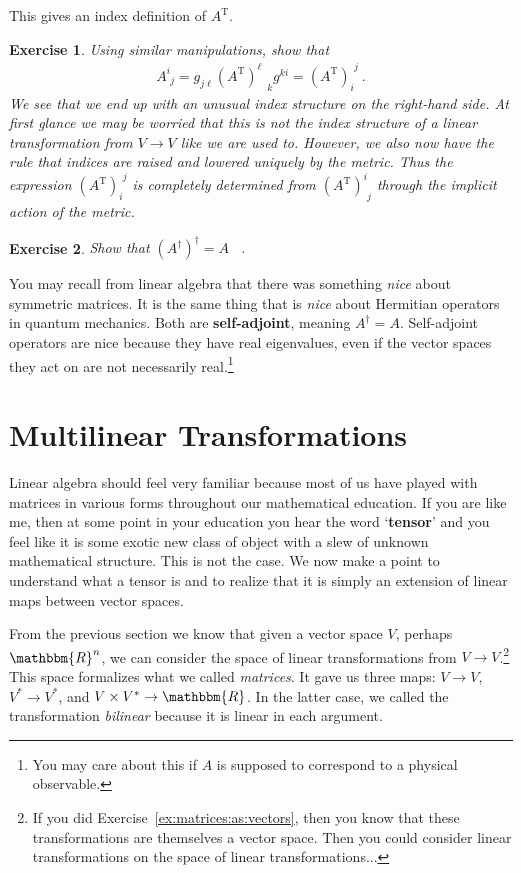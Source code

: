 \documentclass[
  11pt,
	colorful,
	raggedright,
]{tufte-style-thesis-flip}
\newtheorem{exercise}{Exercise}[section]
\newcommand{\aij}[2]{^{#1}_{\phantom{#1}#2}}
\begin{document}
This gives an index definition of $A^\text{T}$. 
\begin{exercise}
Using similar manipulations, show that
\begin{align}
  A\aij{
  i}{j} = g_{j\ell} \left(A^\text{T}\right)\aij{\ell}{k} g^{ki} 
  = \left(A^\text{T}\right)_i^{\phantom{i}j} 
  \ .
\end{align}
We see that we end up with an unusual index structure on the right-hand side. At first glance we may be worried that this is not the index structure of a linear transformation from $V\to V$ like we are used to. However, we also now have the rule that indices are raised and lowered uniquely by the metric. Thus the expression $\left(A^\text{T}\right)_i^{\phantom{i}j}$ is completely determined from $\left(A^\text{T}\right)\aij{i}{j}$ through the implicit action of the metric.
\end{exercise}


\begin{exercise}
Show that $\left(A^\dag\right)^\dag = A$ \ .
\end{exercise}



You may recall from linear algebra that there was something \emph{nice} about symmetric matrices. It is the same thing that is \emph{nice} about Hermitian operators in quantum mechanics. Both are \textbf{self-adjoint}, meaning $A^\dag = A$. Self-adjoint operators are nice because they have real eigenvalues, even if the vector spaces they act on are not necessarily real.\footnote{You may care about this if $A$ is supposed to correspond to a physical observable.}


\section{Multilinear Transformations} %

Linear algebra should feel very familiar because most of us have played with matrices in various forms throughout our mathematical education. If you are like me, then at some point in your education you hear the word `\textbf{tensor}' and you feel like it is some exotic new class of object with a slew of unknown mathematical structure. This is not the case. We now make a point to understand what a tensor is and to realize that it is simply an extension of linear maps between vector spaces. 

From the previous section we know that given a vector space $V$, perhaps $\mathbbm{R}^n$, we can consider the space of linear transformations from $V\to V$.\footnote{If you did Exercise~\ref{ex:matrices:as:vectors}, then you know that these transformations are themselves a vector space. Then you could consider  linear transformations on the space of linear transformations...} This space formalizes what we called \emph{matrices}. It gave us three maps: $V\to V$, $V^* \to V^*$, and $V\times V^*\to \mathbbm{R}$. In the latter case, we called the transformation \emph{bilinear} because it is linear in each argument. 
\end{document}
